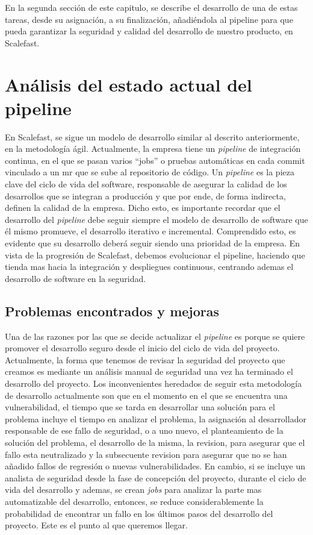 \documentclass[12pt]{report} %
\begin{document}
En la segunda sección de este capitulo, se describe el desarrollo de una de
estas tareas, desde su asignación, a su finalización, añadiéndola al
\gls{pipeline} para que pueda garantizar la seguridad y calidad del desarrollo
de nuestro producto, en Scalefast.

\section{Análisis del estado actual del pipeline} %

En Scalefast, se sigue un modelo de desarrollo similar al descrito
anteriormente, en la metodología ágil.
Actualmente, la empresa tiene un \textit{\gls{pipeline}} de integración 
continua, en el que se pasan varios ``jobs'' o pruebas automáticas en cada
commit vinculado a un \acrfull{mr} que se sube al repositorio de código.  
Un \textit{\gls{pipeline}} es la pieza clave del ciclo de vida del software,
responsable de asegurar la calidad de los desarrollos que se integran a
producción y que por ende, de forma indirecta, definen la calidad de la 
empresa.  
Dicho esto, es importante recordar que el desarrollo del 
\textit{\gls{pipeline}} debe seguir siempre el modelo de desarrollo de 
software que él mismo promueve, el desarrollo iterativo e incremental.
Comprendido esto, es evidente que su desarrollo deberá seguir siendo una
prioridad de la empresa.
En vista de la progresión de Scalefast, debemos evolucionar el pipeline,
haciendo que tienda mas hacia la integración y despliegues continuous, 
centrando ademas el desarrollo de software en la seguridad.  

\subsection{Problemas encontrados y mejoras}

Una de las razones por las que se decide actualizar el \textit{\gls{pipeline}}
es porque se quiere promover el desarrollo seguro desde el inicio del ciclo de
vida del proyecto.  Actualmente, la forma que tenemos de revisar la seguridad
del proyecto que creamos es mediante un análisis manual de seguridad una vez ha
terminado el desarrollo del proyecto.  Los inconvenientes heredados de seguir
esta metodología de desarrollo actualmente son que en el momento en el que se
encuentra una vulnerabilidad, el tiempo que se tarda en desarrollar una solución
para el problema incluye el tiempo en analizar el problema, la asignación al
desarrollador responsable de ese fallo de seguridad, o a uno nuevo, el
planteamiento de la solución del problema, el desarrollo de la misma, la
revision, para asegurar que el fallo esta neutralizado y la subsecuente revision
para asegurar que no se han añadido fallos de regresión o nuevas
vulnerabilidades.  En cambio, si se incluye un analista de seguridad desde la
fase de concepción del proyecto, durante el ciclo de vida del desarrollo y
ademas, se crean \textit{\gls{job}s} para analizar la parte mas automatizable
del desarrollo, entonces, se reduce considerablemente la probabilidad de
encontrar un fallo en los últimos pasos del desarrollo del proyecto.  Este es el
punto al que queremos llegar.
\end{document}
